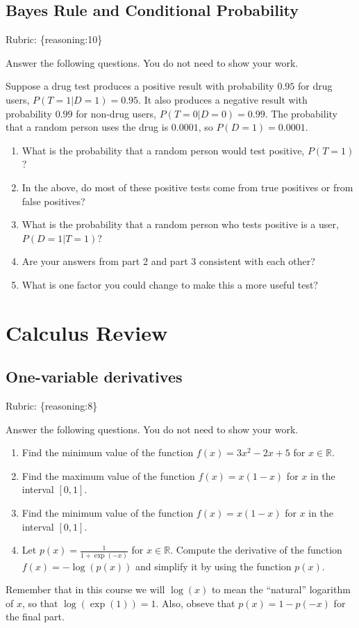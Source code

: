 \documentclass{article}
\def\rubric#1{\gre{Rubric: \{#1\}}}{}
\def\blu#1{{\color{blu}#1}}
\def\gre#1{{\color{gre}#1}}
\def\R{\mathbb{R}}
\begin{document}
\subsection{Bayes Rule and Conditional Probability}
\rubric{reasoning:10}

\blu{Answer the following questions.} You do not need to show your work.

Suppose a drug test produces a positive result with probability $0.95$ for drug users, $P(T=1|D=1)=0.95$. It also produces a negative result with probability $0.99$ for non-drug users, $P(T=0|D=0)=0.99$. The probability that a random person uses the drug is $0.0001$, so $P(D=1)=0.0001$. 

\begin{enumerate}
\item What is the probability that a random person would test positive, $P(T=1)$?
\item In the above, do most of these positive tests come from true positives or from false positives? 
\item What is the probability that a random person who tests positive is a user, $P(D=1|T=1)$?
\item Are your answers from part 2 and part 3 consistent with each other?
\item What is one factor you could change to make this a more useful test?
\end{enumerate}


\section{Calculus Review}


\subsection{One-variable derivatives}
\rubric{reasoning:8}

\blu{Answer the following questions.} You do not need to show your work.

\begin{enumerate}
\item Find the minimum value of the function $f(x) = 3x^2 -2x + 5$ for $x \in \R$.
\item Find the maximum value of the function $f(x) = x(1-x)$ for $x$ in the interval $[0,1]$.
\item Find the minimum value of the function $f(x) = x(1-x)$ for $x$ in the interval $[0,1]$.
\item Let $p(x) = \frac{1}{1+\exp(-x)}$ for $x \in \R$. Compute the derivative of the function $f(x) = -\log(p(x))$ and simplify it by using the function $p(x)$.
\end{enumerate}
Remember that in this course we will $\log(x)$ to mean the ``natural'' logarithm of $x$, so that $\log(\exp(1)) = 1$. Also, obseve that $p(x) = 1-p(-x)$ for the final part.
\end{document}

